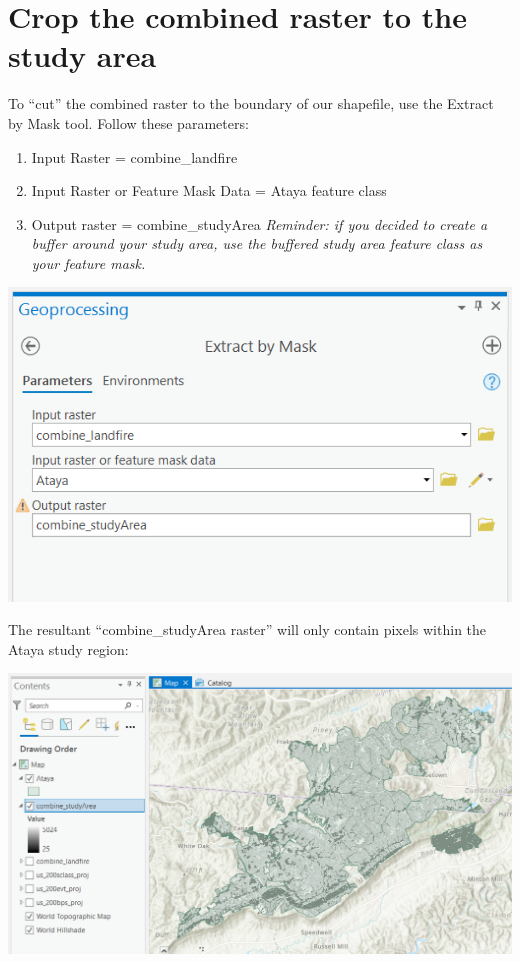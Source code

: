 \documentclass[
]{book}
\providecommand{\tightlist}{%
  \setlength{\itemsep}{0pt}\setlength{\parskip}{0pt}}
\begin{document}
\hypertarget{crop-the-combined-raster-to-the-study-area}{%
\section{Crop the combined raster to the study area}\label{crop-the-combined-raster-to-the-study-area}}

To ``cut'' the combined raster to the boundary of our shapefile, use the Extract by Mask tool. Follow these parameters:

\begin{enumerate}
\def\labelenumi{\arabic{enumi}.}
\tightlist
\item
  Input Raster = combine\_landfire
\item
  Input Raster or Feature Mask Data = Ataya feature class
\item
  Output raster = combine\_studyArea
  \emph{Reminder: if you decided to create a buffer around your study area, use the buffered study area feature class as your feature mask.}
\end{enumerate}

\includegraphics[width=1000px]{04_gis_screenshots/11_extract}

The resultant ``combine\_studyArea raster'' will only contain pixels within the Ataya study region:

\includegraphics[width=1000px]{04_gis_screenshots/12_combine_studyArea}
\end{document}
